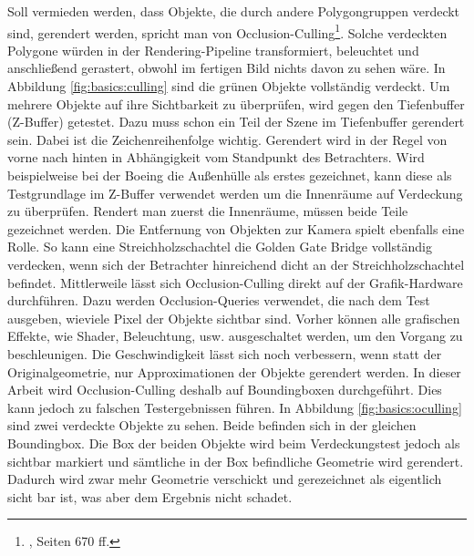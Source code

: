 Soll vermieden werden, dass Objekte, die durch andere Polygongruppen verdeckt sind, gerendert werden, spricht man von Occlusion-Culling\footnote{\cite{RTR3}, Seiten 670 ff.}. Solche verdeckten Polygone würden in der Rendering-Pipeline transformiert, beleuchtet und anschließend gerastert, obwohl im fertigen Bild nichts davon zu sehen wäre. In Abbildung \ref{fig:basics:culling} sind die grünen Objekte vollständig verdeckt. Um mehrere Objekte auf ihre Sichtbarkeit zu überprüfen, wird gegen den Tiefenbuffer (Z-Buffer) getestet. Dazu muss schon ein Teil der Szene im Tiefenbuffer gerendert sein. Dabei ist die Zeichenreihenfolge wichtig. Gerendert wird in der Regel von vorne nach hinten in Abhängigkeit vom Standpunkt des Betrachters. Wird beispielweise bei der Boeing die Außenhülle als erstes gezeichnet, kann diese als Testgrundlage im Z-Buffer verwendet werden um die Innenräume auf Verdeckung zu überprüfen. Rendert man zuerst die Innenräume, müssen beide Teile gezeichnet werden. Die Entfernung von Objekten zur Kamera spielt ebenfalls eine Rolle. So kann eine Streichholzschachtel die Golden Gate Bridge vollständig verdecken, wenn sich der Betrachter hinreichend dicht an der Streichholzschachtel befindet. Mittlerweile lässt sich Occlusion-Culling direkt auf der Grafik-Hardware durchführen. Dazu werden Occlusion-Queries verwendet, die nach dem Test ausgeben, wieviele Pixel der Objekte sichtbar sind. Vorher können alle grafischen Effekte, wie Shader, Beleuchtung, usw. ausgeschaltet werden, um den Vorgang zu beschleunigen. Die Geschwindigkeit lässt sich noch verbessern, wenn statt der Originalgeometrie, nur Approximationen der Objekte gerendert werden. In dieser Arbeit wird Occlusion-Culling deshalb auf Boundingboxen durchgeführt. Dies kann jedoch zu falschen Testergebnissen führen. In Abbildung \ref{fig:basics:oculling} sind zwei verdeckte Objekte zu sehen. Beide befinden sich in der gleichen Boundingbox. Die Box der beiden Objekte wird beim Verdeckungstest jedoch als sichtbar markiert und sämtliche in der Box befindliche Geometrie wird gerendert. Dadurch wird zwar mehr Geometrie verschickt und gerezeichnet als eigentlich sicht bar ist, was aber dem Ergebnis nicht schadet.

